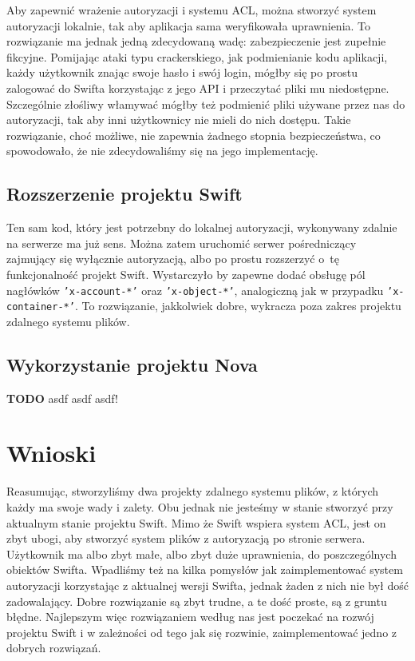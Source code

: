	Aby zapewnić wrażenie autoryzacji i systemu ACL, można stworzyć system autoryzacji lokalnie, tak aby aplikacja sama weryfikowała uprawnienia. To rozwiązanie ma jednak jedną zdecydowaną wadę: zabezpieczenie jest zupełnie fikcyjne. Pomijając ataki typu crackerskiego, jak podmienianie kodu aplikacji, każdy użytkownik znając swoje hasło i swój login, mógłby się po prostu zalogować do Swifta korzystając z jego API i przeczytać pliki mu niedostępne. Szczególnie złośliwy włamywać mógłby też podmienić pliki używane przez nas do autoryzacji, tak aby inni użytkownicy nie mieli do nich dostępu. Takie rozwiązanie, choć możliwe, nie zapewnia żadnego stopnia bezpieczeństwa, co spowodowało, że nie zdecydowaliśmy się na jego implementację.

	\subsection{Rozszerzenie projektu Swift}\label{sub:rozszerzenie projektu swift}

	Ten sam kod, który jest potrzebny do lokalnej autoryzacji, wykonywany zdalnie na serwerze ma już sens. Można zatem uruchomić serwer pośredniczący zajmujący się wyłącznie autoryzacją, albo po prostu rozszerzyć o~tę funkcjonalność projekt Swift. Wystarczyło by zapewne dodać obsługę pól nagłówków \texttt{'x-account-*'} oraz \texttt{'x-object-*'}, analogiczną jak w przypadku \texttt{'x-container-*'}. To rozwiązanie, jakkolwiek dobre, wykracza poza zakres projektu zdalnego systemu plików.
	
	\subsection{Wykorzystanie projektu Nova}\label{sub:wykorzystanie projektu nova}

	\textbf{TODO} asdf asdf asdf!
	
	\section{Wnioski}\label{sec:wnioski}

	Reasumując, stworzyliśmy dwa projekty zdalnego systemu plików, z których każdy ma swoje wady i zalety. Obu jednak nie jesteśmy w stanie stworzyć przy aktualnym stanie projektu Swift. Mimo że Swift wspiera system ACL, jest on zbyt ubogi, aby stworzyć system plików z autoryzacją po stronie serwera. Użytkownik ma albo zbyt małe, albo zbyt duże uprawnienia, do poszczególnych obiektów Swifta. Wpadliśmy też na kilka pomysłów jak zaimplementować system autoryzacji korzystając z aktualnej wersji Swifta, jednak żaden z nich nie był dość zadowalający. Dobre rozwiązanie są zbyt trudne, a te dość proste, są z gruntu błędne. Najlepszym więc rozwiązaniem według nas jest poczekać na rozwój projektu Swift i w zależności od tego jak się rozwinie, zaimplementować jedno z dobrych rozwiązań.



